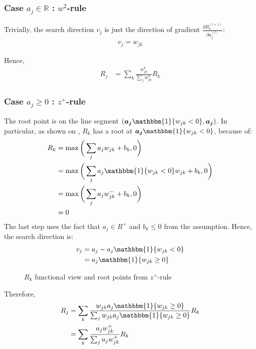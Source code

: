 \subsubsection{Case $a_j \in \mathbb{R}$ : $w^2$-rule}

Trivially, the search direction $v_j$ is just the direction of gradient $\frac{\partial  R_k^{(l+1)} }{ \partial a_j^{(l)} }$:
\begin{align*}
	v_j = w_{jk}
\end{align*}

Hence, 
\begin{align*}
	R_j &=	\sum_k \frac{ w_{jk}^2  }{\sum_{j} w_{jk}^2}  R_k
\end{align*}

\subsubsection{Case $a_j \ge 0$ : $z^+$-rule}
The root point is on the line segment $( \patvector{a_j} \mathbbm{1}\{ w_{jk}  < 0 \}, \patvector{a_j} )$. In particular, as shown on \addfigure{\ref{fig:zplus_rule_cases}}, $R_k$ has a root at $\patvector{a_j} \mathbbm{1}\{ w_{jk}  < 0 \}$, because of:
\begin{align}	
R_k &= \max \bigg( \sum_j a_j w_{jk } + b_k, 0 \bigg) \\
&=  \max \bigg( \sum_j a_j \mathbbm{1}\{ w_{jk}  < 0 \} w_{jk} + b_k, 0 \bigg) \\
&=  \max \bigg(\sum_j a_j  w_{jk}^- + b_k , 0\bigg) \\
&= 0 \label{eq:zplus_rk_zero}
\end{align}
The last step uses the fact that $a_j \in R^+$ and $b_k \le 0$ from the assumption. Hence, the search direction is:
\begin{align*}
	v_j &= a_j - a_j \mathbbm{1}\{ w_{jk}  < 0 \} \\
	&= a_j \mathbbm{1}\{ w_{jk}  \ge 0 \}
\end{align*}

\begin{figure}[!htb]
\centering
{}
\caption{$R_k$ functional view and root points from $z^+$-rule}
\label{fig:zplus_rule_cases}
\end{figure}



Therefore, 
\begin{align*}
		R_j &=	\sum_k \frac{ w_{jk} a_j \mathbbm{1}\{ w_{jk}  \ge 0 \}  }{\sum_{j} w_{jk} a_j \mathbbm{1}\{ w_{jk}  \ge 0 \} }  R_k\\
		&=	\sum_k  \frac{ a_j  w_{jk}^+   }{\sum_{j}  a_j w_{jk}^+  }  R_k
\end{align*}

